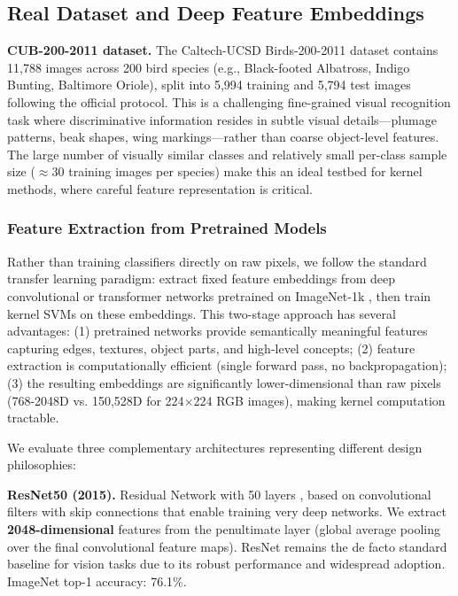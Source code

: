 \documentclass[11pt]{article}
\begin{document}
\subsection{Real Dataset and Deep Feature Embeddings}

\textbf{CUB-200-2011 dataset.} The Caltech-UCSD Birds-200-2011 dataset \cite{wah2011caltech} contains 11,788 images across 200 bird species (e.g., Black-footed Albatross, Indigo Bunting, Baltimore Oriole), split into 5,994 training and 5,794 test images following the official protocol. This is a challenging fine-grained visual recognition task where discriminative information resides in subtle visual details---plumage patterns, beak shapes, wing markings---rather than coarse object-level features. The large number of visually similar classes and relatively small per-class sample size ($\approx 30$ training images per species) make this an ideal testbed for kernel methods, where careful feature representation is critical.

\subsubsection{Feature Extraction from Pretrained Models}

Rather than training classifiers directly on raw pixels, we follow the standard transfer learning paradigm: extract fixed feature embeddings from deep convolutional or transformer networks pretrained on ImageNet-1k \cite{deng2009imagenet}, then train kernel SVMs on these embeddings. This two-stage approach has several advantages: (1) pretrained networks provide semantically meaningful features capturing edges, textures, object parts, and high-level concepts; (2) feature extraction is computationally efficient (single forward pass, no backpropagation); (3) the resulting embeddings are significantly lower-dimensional than raw pixels (768-2048D vs. 150,528D for 224$\times$224 RGB images), making kernel computation tractable.

We evaluate three complementary architectures representing different design philosophies:

\textbf{ResNet50 (2015).} Residual Network with 50 layers \cite{he2016deep}, based on convolutional filters with skip connections that enable training very deep networks. We extract \textbf{2048-dimensional} features from the penultimate layer (global average pooling over the final convolutional feature maps). ResNet remains the de facto standard baseline for vision tasks due to its robust performance and widespread adoption. ImageNet top-1 accuracy: 76.1\%.
\end{document}

